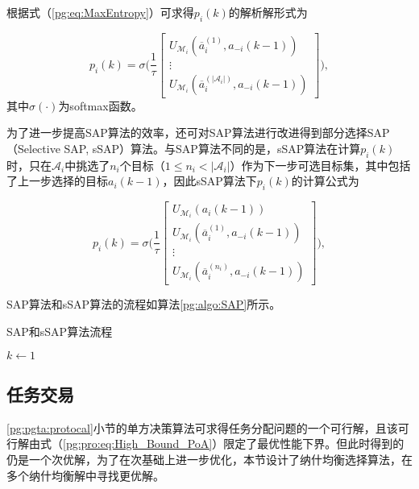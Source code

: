 根据式（\ref{pg:eq:MaxEntropy}）可求得$p_i(k)$的解析解形式为

\begin{equation}
\label{pg:eq:sappdf}
	p_i(k) = \sigma \Bigg(\frac{1}{\tau}\begin{bmatrix}
		U_{\mathcal{M}_i}(\overline a_i^{(1)},a_{-i}(k-1))\\ \vdots \\ U_{\mathcal{M}_i}(\overline a_i^{(|\mathcal{A}_i|)},a_{-i}(k-1))
	\end{bmatrix} \Bigg),
\end{equation}
其中$\sigma(\cdot)$为softmax函数。

为了进一步提高SAP算法的效率，还可对SAP算法进行改进得到部分选择SAP（Selective SAP, sSAP）算法。与SAP算法不同的是，sSAP算法在计算$p_i(k)$时，只在$\mathcal{A}_i$中挑选了$n_i$个目标（$1 \leq n_i < |\mathcal{A}_i|$）作为下一步可选目标集，其中包括了上一步选择的目标$a_i(k-1)$，因此sSAP算法下$p_i(k)$的计算公式为

\begin{equation}
\label{pg:eq:ssappdf}
	p_i(k) = \sigma \Bigg(\frac{1}{\tau}\begin{bmatrix}
		U_{\mathcal{M}_i}(a_i(k-1))\\ U_{\mathcal{M}_i}(\overline a_i^{(1)},a_{-i}(k-1))\\
	\vdots \\ U_{\mathcal{M}_i}(\overline a_i^{(n_i)},a_{-i}(k-1))
	\end{bmatrix} \Bigg),
\end{equation}

SAP算法和sSAP算法的流程如算法\ref{pg:algo:SAP}所示。

\begin{algorithm}[htb]
	\caption{SAP和sSAP算法流程}
	\label{pg:algo:SAP}
	\small
	\SetAlgoLined
	$k \gets 1$\;
\end{algorithm}

\subsection{任务交易}
\label{pg:selection}
\ref{pg:pgta:protocal}小节的单方决策算法可求得任务分配问题的一个可行解，且该可行解由式（\ref{pg:pro:eq:High_Bound_PoA}）限定了最优性能下界。但此时得到的仍是一个次优解，为了在次基础上进一步优化，本节设计了纳什均衡选择算法，在多个纳什均衡解中寻找更优解。

